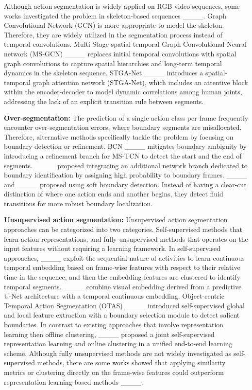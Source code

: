 Although action segmentation is widely applied on RGB video sequences, some works investigated the problem in skeleton-based sequences ____. Graph Convolutional Network (GCN) is more appropriate to model the skeleton. Therefore, they are widely utilized in the segmentation process instead of temporal convolutions.  Multi-Stage spatial-temporal Graph Convolutional Neural network (MS-GCN) ____ replaces initial temporal convolutions with spatial graph convolutions to capture spatial hierarchies and long-term temporal dynamics in the skeleton sequence. STGA-Net ____ introduces a spatial-temporal graph attention network (STGA-Net), which includes an attentive block within the encoder-decoder to model dynamic correlations among human joints, addressing the lack of an explicit transition rule between segments. 


\textbf{Over-segmentation:} The prediction of a single action class per frame frequently encounter over-segmentation errors, where boundary segments are misallocated. Therefore, alternative methods specifically tackle the problem by focusing on boundary detection or refinement. BCN ____ mitigates boundary ambiguity by introducing a refinement branch for MS-TCN to detect the start and the end of segments. ____ proposed integrating an additional network branch dedicated to boundary identification by assigning high probability to boundary frames. ____ and ____ proposed using soft boundary detection. Instead of having a clear-cut distinction of where one action ends and another begins, they detect fluid transitions for more robust boundary localization.

\textbf{Unsupervised action segmentation:} Unsupervised action segmentation approaches can be categorized into two categories. Self-supervised methods that learn action representations, and fully unsupervised methods that operates on the input features without requiring a learning framework. In self-supervised approaches, ____ exploit the sequential nature of activities to learn continuous temporal embedding based on frame-wise features with respect to their relative time in the sequence, and then the embedding features are clustered to identify temporal segments. ____ combine visual embedding derived from a predictive U-Net architecture with a temporal continuous embedding. Object-centric Temporal Action Segmentation (OTAS) ____ introduced self-supervised global and local feature extraction with a boundary selection module to detect salient boundaries. In contrast to existing approaches that involve representation learning then offline clustering, ____ proposed a joint self-supervised representation learning and online clustering in a unified end-to-end learning scheme. Although fully unsupervised methods are not widely investigated as self-supervised methods, there are some works  showed that applying similarity metrics or clustering directly on the frame-wise features could outperform representation learning-based methods ____. 

